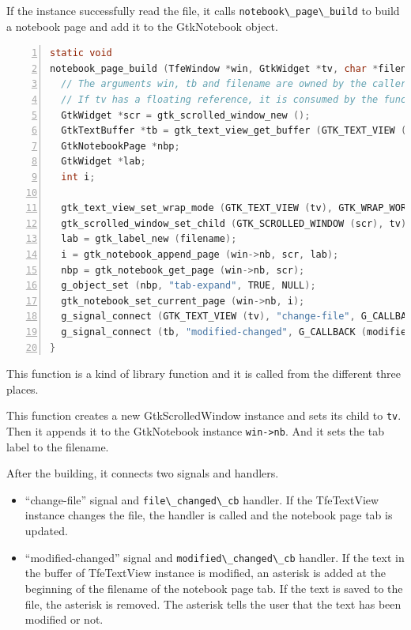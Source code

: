 If the instance successfully read the file, it calls
\passthrough{\lstinline!notebook\_page\_build!} to build a notebook page
and add it to the GtkNotebook object.

\begin{lstlisting}[language=C, numbers=left]
static void
notebook_page_build (TfeWindow *win, GtkWidget *tv, char *filename) {
  // The arguments win, tb and filename are owned by the caller.
  // If tv has a floating reference, it is consumed by the function.
  GtkWidget *scr = gtk_scrolled_window_new ();
  GtkTextBuffer *tb = gtk_text_view_get_buffer (GTK_TEXT_VIEW (tv));
  GtkNotebookPage *nbp;
  GtkWidget *lab;
  int i;

  gtk_text_view_set_wrap_mode (GTK_TEXT_VIEW (tv), GTK_WRAP_WORD_CHAR);
  gtk_scrolled_window_set_child (GTK_SCROLLED_WINDOW (scr), tv);
  lab = gtk_label_new (filename);
  i = gtk_notebook_append_page (win->nb, scr, lab);
  nbp = gtk_notebook_get_page (win->nb, scr);
  g_object_set (nbp, "tab-expand", TRUE, NULL);
  gtk_notebook_set_current_page (win->nb, i);
  g_signal_connect (GTK_TEXT_VIEW (tv), "change-file", G_CALLBACK (file_changed_cb), win->nb);
  g_signal_connect (tb, "modified-changed", G_CALLBACK (modified_changed_cb), tv);
}
\end{lstlisting}

This function is a kind of library function and it is called from the
different three places.

This function creates a new GtkScrolledWindow instance and sets its
child to \passthrough{\lstinline!tv!}. Then it appends it to the
GtkNotebook instance \passthrough{\lstinline!win->nb!}. And it sets the
tab label to the filename.

After the building, it connects two signals and handlers.

\begin{itemize}
\tightlist
\item
  ``change-file'' signal and \passthrough{\lstinline!file\_changed\_cb!}
  handler. If the TfeTextView instance changes the file, the handler is
  called and the notebook page tab is updated.
\item
  ``modified-changed'' signal and
  \passthrough{\lstinline!modified\_changed\_cb!} handler. If the text
  in the buffer of TfeTextView instance is modified, an asterisk is
  added at the beginning of the filename of the notebook page tab. If
  the text is saved to the file, the asterisk is removed. The asterisk
  tells the user that the text has been modified or not.
\end{itemize}


